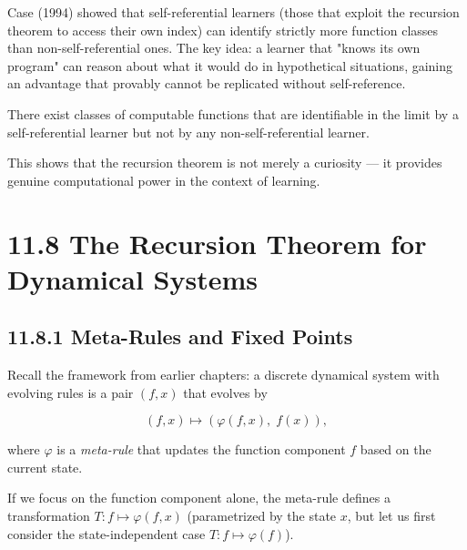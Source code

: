 Case (1994) showed that self-referential learners (those that exploit the recursion theorem to access their own index) can identify strictly more function classes than non-self-referential ones. The key idea: a learner that "knows its own program" can reason about what it would do in hypothetical situations, gaining an advantage that provably cannot be replicated without self-reference.

\begin{theorem}[Case 1994]
There exist classes of computable functions that are identifiable in the limit by a self-referential learner but not by any non-self-referential learner.

This shows that the recursion theorem is not merely a curiosity --- it provides genuine computational power in the context of learning.
\end{theorem}

\section{11.8 The Recursion Theorem for Dynamical Systems}

\subsection{11.8.1 Meta-Rules and Fixed Points}

Recall the framework from earlier chapters: a discrete dynamical system with evolving rules is a pair $(f, x)$ that evolves by

\[
(f, x) \longmapsto (\varphi(f, x),\; f(x)),
\]

where $\varphi$ is a \textit{meta-rule} that updates the function component $f$ based on the current state.

If we focus on the function component alone, the meta-rule defines a transformation $T: f \mapsto \varphi(f, x)$ (parametrized by the state $x$, but let us first consider the state-independent case $T: f \mapsto \varphi(f)$).


